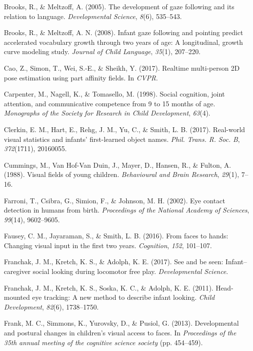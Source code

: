 \documentclass[english,man]{apa6}
\begin{document}
\hypertarget{ref-brooks2005}{}
Brooks, R., \& Meltzoff, A. (2005). The development of gaze following
and its relation to language. \emph{Developmental Science}, \emph{8}(6),
535--543.

\hypertarget{ref-brooks2008}{}
Brooks, R., \& Meltzoff, A. N. (2008). Infant gaze following and
pointing predict accelerated vocabulary growth through two years of age:
A longitudinal, growth curve modeling study. \emph{Journal of Child
Language}, \emph{35}(1), 207--220.

\hypertarget{ref-cao2017realtime}{}
Cao, Z., Simon, T., Wei, S.-E., \& Sheikh, Y. (2017). Realtime
multi-person 2D pose estimation using part affinity fields. In
\emph{CVPR}.

\hypertarget{ref-carpenter1998}{}
Carpenter, M., Nagell, K., \& Tomasello, M. (1998). Social cognition,
joint attention, and communicative competence from 9 to 15 months of
age. \emph{Monographs of the Society for Research in Child Development},
\emph{63}(4).

\hypertarget{ref-clerkin2017}{}
Clerkin, E. M., Hart, E., Rehg, J. M., Yu, C., \& Smith, L. B. (2017).
Real-world visual statistics and infants' first-learned object names.
\emph{Phil. Trans. R. Soc. B}, \emph{372}(1711), 20160055.

\hypertarget{ref-cummings1988}{}
Cummings, M., Van Hof-Van Duin, J., Mayer, D., Hansen, R., \& Fulton, A.
(1988). Visual fields of young children. \emph{Behavioural and Brain
Research}, \emph{29}(1), 7--16.

\hypertarget{ref-farroni2002eye}{}
Farroni, T., Csibra, G., Simion, F., \& Johnson, M. H. (2002). Eye
contact detection in humans from birth. \emph{Proceedings of the
National Academy of Sciences}, \emph{99}(14), 9602--9605.

\hypertarget{ref-fausey2016}{}
Fausey, C. M., Jayaraman, S., \& Smith, L. B. (2016). From faces to
hands: Changing visual input in the first two years. \emph{Cognition},
\emph{152}, 101--107.

\hypertarget{ref-franchak2017see}{}
Franchak, J. M., Kretch, K. S., \& Adolph, K. E. (2017). See and be
seen: Infant--caregiver social looking during locomotor free play.
\emph{Developmental Science}.

\hypertarget{ref-franchak2011}{}
Franchak, J. M., Kretch, K. S., Soska, K. C., \& Adolph, K. E. (2011).
Head-mounted eye tracking: A new method to describe infant looking.
\emph{Child Development}, \emph{82}(6), 1738--1750.

\hypertarget{ref-frank2013}{}
Frank, M. C., Simmons, K., Yurovsky, D., \& Pusiol, G. (2013).
Developmental and postural changes in children's visual access to faces.
In \emph{Proceedings of the 35th annual meeting of the cognitive science
society} (pp. 454--459).
\end{document}
